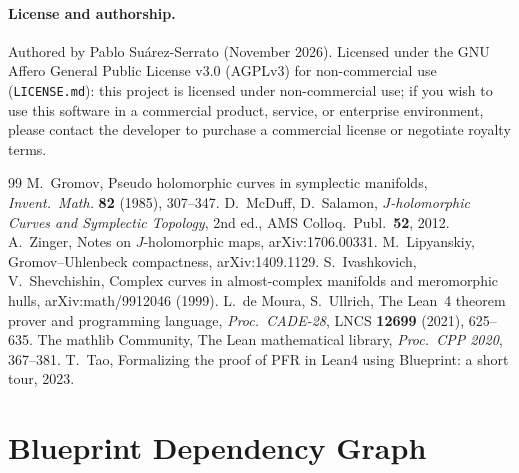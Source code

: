 \documentclass[10pt]{article}
\renewcommand{\_}{\origus\allowbreak}
\newcommand{\code}[1]{\texttt{#1}}
\begin{document}
\paragraph{License and authorship.}
Authored by Pablo Su\'arez-Serrato (November 2026). Licensed under the GNU Affero General Public
License v3.0 (AGPLv3) for non-commercial use (\code{LICENSE.md}): this project is licensed under
non-commercial use; if you wish to use this software in a commercial product, service, or enterprise
environment, please contact the developer to purchase a commercial license or negotiate royalty terms.

\begin{thebibliography}{99}\footnotesize\sloppy
\setlength{\itemsep}{1pt}
 M.~Gromov, Pseudo holomorphic curves in symplectic manifolds,
  \emph{Invent.\ Math.} \textbf{82} (1985), 307--347.
 D.~McDuff, D.~Salamon, \emph{$J$-holomorphic Curves and Symplectic
  Topology}, 2nd ed., AMS Colloq.\ Publ.\ \textbf{52}, 2012.
 A.~Zinger, Notes on $J$-holomorphic maps, arXiv:1706.00331.
 M.~Lipyanskiy, Gromov--Uhlenbeck compactness, arXiv:1409.1129.
 S.~Ivashkovich, V.~Shevchishin, Complex curves in almost-complex
  manifolds and meromorphic hulls, arXiv:math/9912046 (1999).
 L.~de Moura, S.~Ullrich, The Lean~4 theorem prover and programming language,
  \emph{Proc.\ CADE-28}, LNCS \textbf{12699} (2021), 625--635.
 The mathlib Community, The Lean mathematical library, \emph{Proc.\ CPP 2020}, 367--381.
 T.~Tao, Formalizing the proof of PFR in Lean4 using Blueprint: a short tour, 2023.
\end{thebibliography}

\newpage
\appendix
\section{Blueprint Dependency Graph}\label{app:graph}
\end{document}
